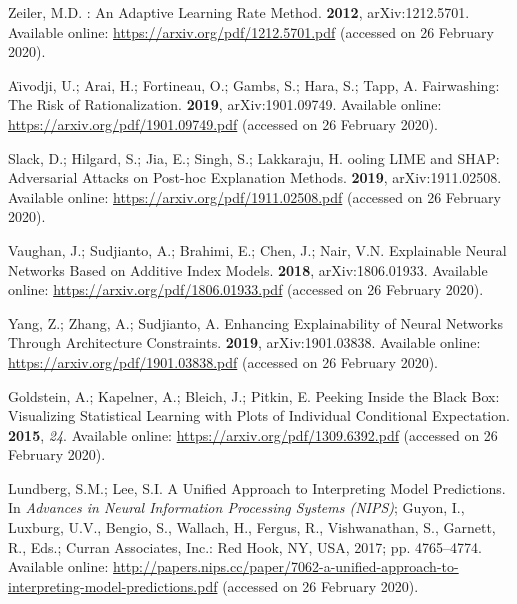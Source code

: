 \documentclass[information,article,accept,moreauthors,pdftex]{Definitions/mdpi}
\begin{document}
\begin{thebibliography}{999}
Zeiler, M.D.
: {A}n {A}daptive {L}earning {R}ate {M}ethod.
 {\bf 2012}, arXiv:1212.5701.
\newblock Available online: \url{https://arxiv.org/pdf/1212.5701.pdf} (accessed on 26 February 2020).

A{\"\i}vodji, U.; Arai, H.; Fortineau, O.; Gambs, S.; Hara, S.; Tapp, A.
\newblock Fairwashing: {T}he {R}isk of {R}ationalization.
 {\bf 2019}, arXiv:1901.09749.
\newblock Available online: \url{https://arxiv.org/pdf/1901.09749.pdf} (accessed on 26 February 2020).

Slack, D.; Hilgard, S.; Jia, E.; Singh, S.; Lakkaraju, H.
ooling {L}{I}{M}{E} and {S}{H}{A}{P}: {A}dversarial {A}ttacks on
  {P}ost-hoc {E}xplanation {M}ethods.
 {\bf 2019}, arXiv:1911.02508.
\newblock Available online: \url{https://arxiv.org/pdf/1911.02508.pdf} (accessed on 26 February 2020).

Vaughan, J.; Sudjianto, A.; Brahimi, E.; Chen, J.; Nair, V.N.
\newblock Explainable {N}eural {N}etworks {B}ased on {A}dditive {I}ndex
  {M}odels.
 {\bf 2018}, arXiv:1806.01933.
\newblock Available online: \url{https://arxiv.org/pdf/1806.01933.pdf} (accessed on 26 February 2020).

Yang, Z.; Zhang, A.; Sudjianto, A.
\newblock Enhancing {E}xplainability of {N}eural {N}etworks {T}hrough
  {A}rchitecture {C}onstraints.
 {\bf 2019}, arXiv:1901.03838.
\newblock Available online: \url{https://arxiv.org/pdf/1901.03838.pdf} (accessed on 26 February 2020).

Goldstein, A.; Kapelner, A.; Bleich, J.; Pitkin, E.
\newblock Peeking {I}nside the {B}lack {B}ox: {V}isualizing {S}tatistical
  {L}earning with {P}lots of {I}ndividual {C}onditional {E}xpectation.
 {\bf 2015},
  {\em 24}.
\newblock Available online: \url{https://arxiv.org/pdf/1309.6392.pdf} (accessed on 26 February 2020).

Lundberg, S.M.; Lee, S.I.
\newblock A {U}nified {A}pproach to {I}nterpreting {M}odel {P}redictions. In
  {\em Advances in Neural Information Processing Systems (NIPS)}; Guyon, I.,
  Luxburg, U.V., Bengio, S., Wallach, H., Fergus, R., Vishwanathan, S.,
  Garnett, R., Eds.; Curran Associates, Inc.: Red Hook, NY, USA, 2017; pp. 4765--4774.  
\newblock Available online: 
  \url{http://papers.nips.cc/paper/7062-a-unified-approach-to-interpreting-model-predictions.pdf} (accessed on 26 February 2020).


\end{thebibliography}
\end{document}

